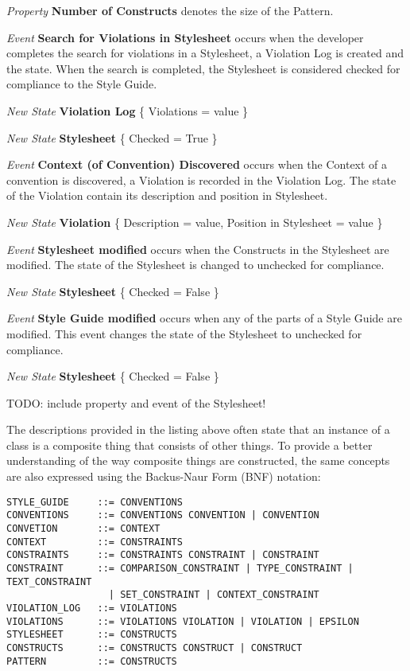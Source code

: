 \documentclass[parskip=full]{uvamscse}
\begin{document}
\begin{description}
\textit{Property} \textbf{Number of Constructs} denotes the size of the Pattern.


\item\textit{Event} \textbf{Search for Violations in Stylesheet} occurs when the developer completes the search for violations in a Stylesheet, a Violation Log is created and the state. When the search is completed, the Stylesheet is considered checked for compliance to the Style Guide.

\textit{New State} \textbf{Violation Log} \{ Violations = value \}

\textit{New State} \textbf{Stylesheet} \{ Checked = True \}


\item\textit{Event} \textbf{Context (of Convention) Discovered} occurs when the Context of a convention is discovered, a Violation is recorded in the Violation Log. The state of the Violation contain its description and position in Stylesheet.

\textit{New State} \textbf{Violation} \{ Description = value, Position in Stylesheet = value \}


\item\textit{Event} \textbf{Stylesheet modified} occurs when the Constructs in the Stylesheet are modified. The state of the Stylesheet is changed to unchecked for compliance.

\textit{New State} \textbf{Stylesheet} \{ Checked = False \}


\item\textit{Event} \textbf{Style Guide modified} occurs when any of the parts of a Style Guide are modified. This event changes the state of the Stylesheet to unchecked for compliance.

\textit{New State} \textbf{Stylesheet} \{ Checked = False \}

\end{description}

TODO: include property and event of the Stylesheet!

The descriptions provided in the listing above often state that an instance of a class is a
composite thing that consists of other things. To provide a better understanding of the way
composite things are constructed, the same concepts are also expressed using the Backus-Naur Form
(BNF) notation:

\begin{snippet}
\begin{verbatim}
STYLE_GUIDE     ::= CONVENTIONS
CONVENTIONS     ::= CONVENTIONS CONVENTION | CONVENTION 
CONVETION       ::= CONTEXT
CONTEXT         ::= CONSTRAINTS
CONSTRAINTS     ::= CONSTRAINTS CONSTRAINT | CONSTRAINT
CONSTRAINT      ::= COMPARISON_CONSTRAINT | TYPE_CONSTRAINT | TEXT_CONSTRAINT 
                  | SET_CONSTRAINT | CONTEXT_CONSTRAINT 
VIOLATION_LOG   ::= VIOLATIONS
VIOLATIONS      ::= VIOLATIONS VIOLATION | VIOLATION | EPSILON
STYLESHEET      ::= CONSTRUCTS
CONSTRUCTS      ::= CONSTRUCTS CONSTRUCT | CONSTRUCT
PATTERN         ::= CONSTRUCTS
\end{verbatim}
\end{snippet}
\end{document}
